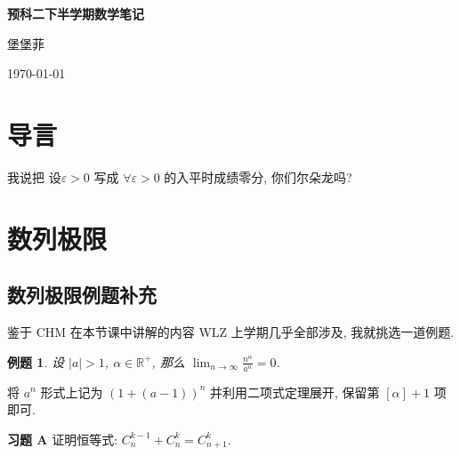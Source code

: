 \documentclass[12pt,a4paper,fontset=none]{ctexart}
\newcounter{theorem_counter}
\theoremstyle{bluehead}
\theoremstyle{redhead}
\newtheorem{example}{例题}[subsection]
\begin{document}
\begin{titlepage}
\centering
\vspace*{\fill}
\begin{minipage}{\textwidth}
  \centering
  {\Huge\bfseries 预科二下半学期数学笔记\par}
  \vspace{1cm}
  {\Large 堡堡菲\par}
  \vspace{1cm}
    {\large \today\par}
\end{minipage}
\vspace*{\fill}
\end{titlepage}


\tableofcontents
\thispagestyle{empty}
\newpage

\section*{导言}

我说把 设$\varepsilon>0$ 写成 $\forall \varepsilon>0$ 的入平时成绩零分, 你们尔朵龙吗?

\newpage


\section{数列极限}

\subsection{数列极限例题补充}

鉴于 CHM 在本节课中讲解的内容 WLZ 上学期几乎全部涉及, 我就挑选一道例题.

\vspace{0.2cm}

\begin{example}
  设 $|a|>1$, $\alpha \in \mathbb{R^+}$, 那么 $\displaystyle \lim_{n \to \infty}\frac{n^\alpha}{a^n}=0$.
\end{example}

将 $a^n$ 形式上记为 $(1+(a-1))^n$ 并利用二项式定理展开, 保留第 $[\alpha]+1$ 项即可.  

\vspace{0.2cm}
\hspace{-2em} \textbf{习题 A} 证明恒等式: $\displaystyle C_{n}^{k-1}+C_{n}^{k}=C_{n+1}^k$.

\vspace{0.2cm}
\end{document}

